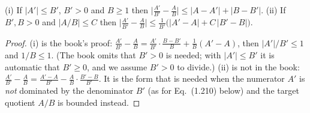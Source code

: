 \begin{lemma}
\label{lem:sg-tal:ratio}
  \leanok
{}
(i) If $|A'|\le B'$, $B'>0$ and $B\ge1$ then $\bigl|\frac{A'}{B'}-\frac AB\bigr|\le|A-A'|+|B-B'|$.
(ii) If $B',B>0$ and $|A/B|\le C$ then $\bigl|\frac{A'}{B'}-\frac AB\bigr|\le\frac1{B'}\bigl(|A'-A|+C\,|B'-B|\bigr)$.
\end{lemma}
\begin{proof}
  \leanok
(i) is the book's proof: $\frac{A'}{B'}-\frac AB=\frac{A'}{B'}\cdot\frac{B-B'}{B}+\frac1B(A'-A)$, then $|A'|/B'\le1$ and $1/B\le1$.  (The book omits that $B'>0$ is needed; with $|A'|\le B'$ it is automatic that $B'\ge0$, and we assume $B'>0$ to divide.)
(ii) is not in the book: $\frac{A'}{B'}-\frac AB=\frac{A'-A}{B'}-\frac AB\cdot\frac{B'-B}{B'}$.  It is the form that is needed when the numerator $A'$ is \emph{not} dominated by the denominator $B'$ (as for Eq.~(1.210) below) and the target quotient $A/B$ is bounded instead.
\end{proof}

